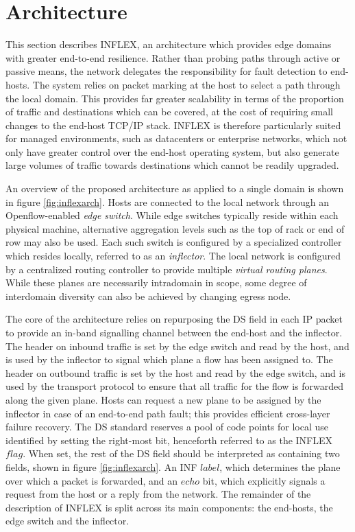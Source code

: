 \section{Architecture}
\label{section:inflex:arch}

This section describes INFLEX, an architecture which provides edge domains with greater end-to-end resilience.
Rather than probing paths through active or passive means, the network delegates the responsibility for fault detection to end-hosts.
The system relies on packet marking at the host to select a path through the local domain.
This provides far greater scalability in terms of the proportion of traffic and destinations which can be covered, at the cost of requiring small changes to the end-host \ac{TCP}/\ac{IP} stack.
INFLEX is therefore particularly suited for managed environments, such as datacenters or enterprise networks, which not only have greater control over the end-host operating system, but also generate large volumes of traffic towards destinations which cannot be readily upgraded.

An overview of the proposed architecture as applied to a single domain is shown in figure \ref{fig:inflexarch}.
Hosts are connected to the local network through an Openflow-enabled \emph{edge switch}.
While edge switches typically reside within each physical machine, alternative aggregation levels such as the top of rack or end of row may also be used.
Each such switch is configured by a specialized controller which resides locally, referred to as an \emph{inflector}.
The local network is configured by a centralized routing controller to provide multiple \emph{virtual routing planes}.
While these planes are necessarily intradomain in scope, some degree of interdomain diversity can also be achieved by changing egress node.

The core of the architecture relies on repurposing the \ac{DS} field in each \ac{IP} packet to provide an in-band signalling channel between the end-host and the inflector.
The header on inbound traffic is set by the edge switch and read by the host, and is used by the inflector to signal which plane a flow has been assigned to.
The header on outbound traffic is set by the host and read by the edge switch, and is used by the transport protocol to ensure that all traffic for the flow is forwarded along the given plane.
Hosts can request a new plane to be assigned by the inflector in case of an end-to-end path fault; this provides efficient cross-layer failure recovery.
The \ac{DS} standard \cite{Blake:1998p370} reserves a pool of code points for local use identified by setting the right-most bit, henceforth referred to as the INFLEX $flag$.
When set, the rest of the \ac{DS} field should be interpreted as containing two fields, shown in figure \ref{fig:inflexarch}. 
An \ac{INF} $label$, which determines the plane over which a packet is forwarded, and an $echo$ bit, which explicitly signals a request from the host or a reply from the network.
The remainder of the description of INFLEX is split across its main components: the end-hosts, the edge switch and the inflector.

